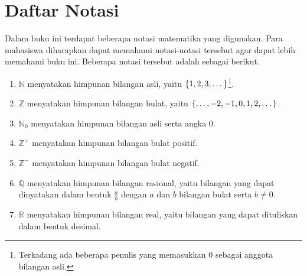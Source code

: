 \chapter{Daftar Notasi}

Dalam buku ini terdapat beberapa notasi matematika yang digunakan. Para mahasiswa diharapkan dapat memahami notasi-notasi tersebut agar dapat lebih memahami buku ini. Beberapa notasi tersebut adalah sebagai berikut.

\begin{enumerate}
	\item $ \mathbb{N} $ menyatakan himpunan bilangan asli, yaitu $ \mathop{}\!\left\lbrace1, 2, 3, \dots\right\rbrace $\footnote{Terkadang ada beberapa penulis yang memasukkan 0 sebagai anggota bilangan asli.}.
	\item $ \mathbb{Z} $ menyatakan himpunan bilangan bulat, yaitu $ \mathop{}\!\left\lbrace\dots, -2, -1, 0, 1, 2, \dots\right\rbrace $.
	\item $ \mathbb{N}_{0} $ menyatakan himpunan bilangan asli serta angka 0.
	\item $ \mathbb{Z}^{+} $ menyatakan himpunan bilangan bulat positif.
	\item $ \mathbb{Z}^{-} $ menyatakan himpunan bilangan bulat negatif.
	\item $ \mathbb{Q} $ menyatakan himpunan bilangan rasional, yaitu bilangan yang dapat dinyatakan dalam bentuk $ \frac{a}{b} $ dengan $ a $ dan $ b $ bilangan bulat serta $ b \ne 0 $.
	\item $ \mathbb{R} $ menyatakan himpunan bilangan real, yaitu bilangan yang dapat dituliskan dalam bentuk desimal.
\end{enumerate}